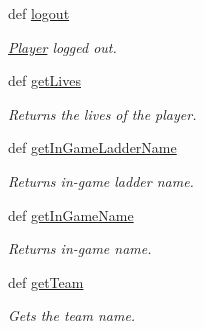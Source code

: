 \begin{DoxyCompactItemize}
def \hyperlink{class_player_1_1_player_a1f91a0f380efed515111952b96f6a90e}{logout}
\begin{DoxyCompactList}\small\item\em \hyperlink{class_player_1_1_player}{Player} logged out. \item\end{DoxyCompactList}\item 
def \hyperlink{class_player_1_1_player_a293131894621a14d2f6741e2be29451d}{getLives}
\begin{DoxyCompactList}\small\item\em Returns the lives of the player. \item\end{DoxyCompactList}\item 
def \hyperlink{class_player_1_1_player_ab810708370e380e49f9e4885f42df037}{getInGameLadderName}
\begin{DoxyCompactList}\small\item\em Returns in-\/game ladder name. \item\end{DoxyCompactList}\item 
def \hyperlink{class_player_1_1_player_a80f2beaf026556ed4b4e432ebec249d4}{getInGameName}
\begin{DoxyCompactList}\small\item\em Returns in-\/game name. \item\end{DoxyCompactList}\item 
def \hyperlink{class_player_1_1_player_abc21f488a31729c70d7fd3dea220c599}{getTeam}
\begin{DoxyCompactList}\small\item\em Gets the team name. \item\end{DoxyCompactList}\end{DoxyCompactItemize}
